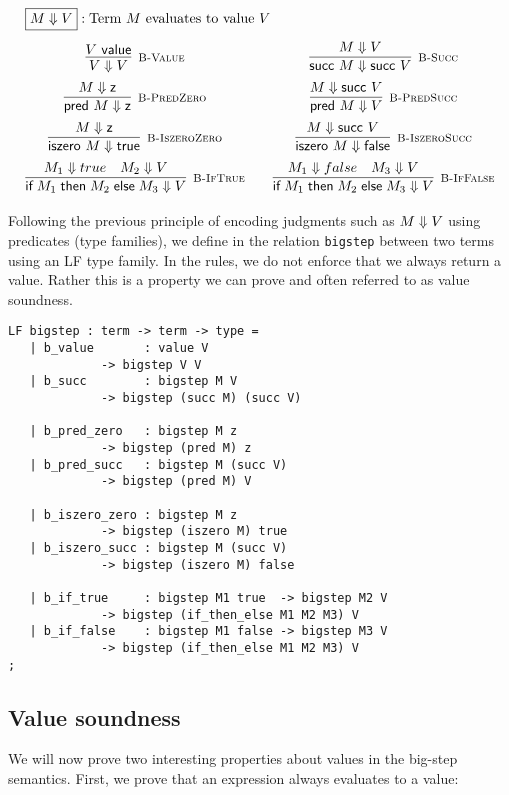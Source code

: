 \[
\begin{array}{c@{\qquad}c}
\multicolumn{2}{l}{\fbox{$M \BSteps V$}: \mbox{Term $M$ evaluates to value $V$}}\\[1em]
  \infer[\BValue]{V \BSteps V}{V \Value} &
  \infer[\BSucc]{\tmsucc M \BSteps \tmsucc V}{M \BSteps V}
\\[0.5em]
  \infer[\BPredZero]{\tmpred M \BSteps \tmzero}{M \BSteps \tmzero} &
  \infer[\BPredSucc]{\tmpred M \BSteps V}{M \BSteps \tmsucc V}
\\[0.5em]
  \infer[\BIszeroZero]{\tmiszero M \BSteps \tmtrue} {M \BSteps \tmzero} &
  \infer[\BIszeroSucc]{\tmiszero M \BSteps \tmfalse}{M \BSteps \tmsucc V}
\\[0.5em]
  \infer[\BIfTrue] {\tmif {M_1}{M_2}{M_3} \BSteps V}{M_1 \BSteps true  & M_2 \BSteps V} &
  \infer[\BIfFalse]{\tmif {M_1}{M_2}{M_3} \BSteps V}{M_1 \BSteps false & M_3 \BSteps V} \\
\end{array}
\]

Following the previous principle of encoding judgments such as $M \Downarrow V$
using predicates (type families), we define in \beluga the relation
\lstinline!bigstep! between two terms using an LF type family. In the rules, we
do not enforce that we always return a value. Rather this is a property we can
prove and often referred to as value soundness.

\begin{lstlisting}
LF bigstep : term -> term -> type =
   | b_value       : value V
		     -> bigstep V V
   | b_succ        : bigstep M V
		     -> bigstep (succ M) (succ V)

   | b_pred_zero   : bigstep M z
		     -> bigstep (pred M) z
   | b_pred_succ   : bigstep M (succ V)
		     -> bigstep (pred M) V

   | b_iszero_zero : bigstep M z
		     -> bigstep (iszero M) true
   | b_iszero_succ : bigstep M (succ V)
		     -> bigstep (iszero M) false

   | b_if_true     : bigstep M1 true  -> bigstep M2 V
		     -> bigstep (if_then_else M1 M2 M3) V
   | b_if_false    : bigstep M1 false -> bigstep M3 V
		     -> bigstep (if_then_else M1 M2 M3) V
;
\end{lstlisting}

\subsection{Value soundness}

We will now prove two interesting properties about values in the big-step semantics.
First, we prove that an expression always evaluates to a value:

